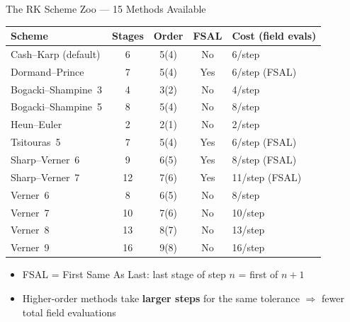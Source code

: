 \documentclass[aspectratio=169, 11pt]{beamer}
\begin{document}
\begin{frame}{The RK Scheme Zoo --- 15 Methods Available}

\begin{table}
\centering\small
\begin{tabular}{@{}lcccl@{}}
  \toprule
  \textbf{Scheme} & \textbf{Stages} & \textbf{Order} & \textbf{FSAL} &
    \textbf{Cost (field evals)} \\
  \midrule
  Cash--Karp (default) & 6 & 5(4) & No & 6/step \\
  Dormand--Prince      & 7 & 5(4) & Yes & 6/step (FSAL) \\
  Bogacki--Shampine~3  & 4 & 3(2) & No & 4/step \\
  Bogacki--Shampine~5  & 8 & 5(4) & No & 8/step \\
  Heun--Euler          & 2 & 2(1) & No & 2/step \\
  Tsitouras~5          & 7 & 5(4) & Yes & 6/step (FSAL) \\
  Sharp--Verner~6      & 9 & 6(5) & Yes & 8/step (FSAL) \\
  Sharp--Verner~7      & 12& 7(6) & Yes & 11/step (FSAL) \\
  Verner~6             & 8 & 6(5) & No & 8/step \\
  Verner~7             & 10& 7(6) & No & 10/step \\
  Verner~8             & 13& 8(7) & No & 13/step \\
  Verner~9             & 16& 9(8) & No & 16/step \\
  \bottomrule
\end{tabular}
\end{table}

\vspace{4pt}
\begin{itemize}
  \item FSAL = First Same As Last: last stage of step $n$ = first of $n{+}1$
  \item Higher-order methods take \textbf{larger steps} for the same tolerance
        $\Rightarrow$ fewer total field evaluations
\end{itemize}
\end{frame}
\end{document}
